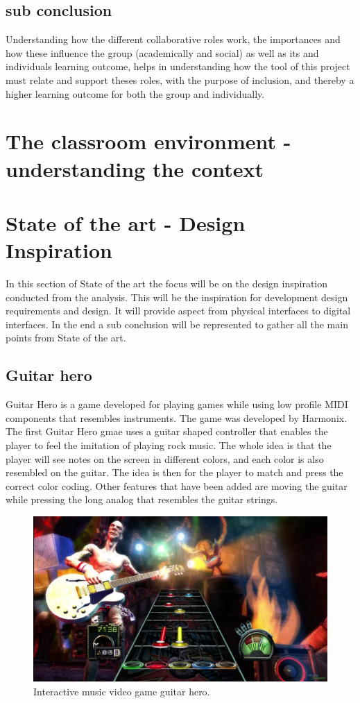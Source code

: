 \subsection{sub conclusion} %
Understanding how the different collaborative roles work, the importances and how these influence the group (academically and social) as well as its and individuals learning outcome, helps in understanding how the tool of this project must relate and support theses roles, with the purpose of inclusion, and thereby a higher learning outcome for both the group and individually. 

\section{The classroom environment -understanding the context} %


\section{State of the art - Design Inspiration}\label{sec:sota}
In this section of State of the art the focus will be on the design inspiration conducted from the analysis. This will be the inspiration for development design requirements and design. It will provide aspect from physical interfaces to digital interfaces. In the end a sub conclusion will be represented to gather all the main points from State of the art. 

\subsection{Guitar hero}\label{sec:guitarHero} 
Guitar Hero is a game developed for playing games while using low profile MIDI components that resembles instruments. The game was developed by Harmonix. The first Guitar Hero gmae uses a guitar shaped controller that enables the player to feel the imitation of playing rock music. The whole idea is that the player will see notes on the screen in different colors, and each color is also resembled on the guitar. The idea is then for the player to match and press the correct color coding. Other features that have been added are moving the guitar while pressing the long analog that resembles the guitar strings. 
\begin{figure}[H]
	\centering
	\includegraphics[width=0.7\linewidth]{figure/Analysis/guitarhero}
	\caption{Interactive music video game guitar hero.}
	\label{fig:guitarHero}
\end{figure}



